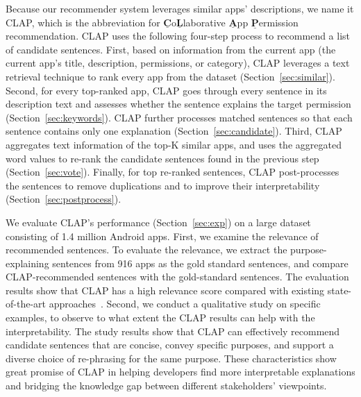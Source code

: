 Because our recommender system leverages similar apps' descriptions, we name it CLAP, which is the abbreviation for $\underline{\textbf{C}}$o$\underline{\textbf{L}}$laborative $\underline{\textbf{A}}$pp $\underline{\textbf{P}}$ermission recommendation. 
CLAP uses the following four-step process to recommend a list of candidate sentences. 
First, based on information from the current app (the current app's title, description, permissions, or category), CLAP leverages a text retrieval technique to rank every app from the dataset (Section~\ref{sec:similar}). 
Second, for every top-ranked app, CLAP goes through every sentence in its description text and assesses whether the sentence explains the target permission (Section~\ref{sec:keywords}). 
CLAP further processes matched sentences so that each sentence contains only one explanation (Section~\ref{sec:candidate}). Third, CLAP aggregates text information of the top-K similar apps, and uses the aggregated word values to re-rank the candidate sentences found in the previous step (Section~\ref{sec:vote}). 
Finally, for top re-ranked sentences, CLAP post-processes the sentences to remove duplications and to improve their interpretability (Section~\ref{sec:postprocess}). 

We evaluate CLAP's performance (Section~\ref{sec:exp}) on a large dataset consisting of 1.4 million Android apps. 
First, we examine the relevance of recommended sentences. \tabularnewline
To evaluate the relevance, we extract the purpose-explaining sentences from 916 apps as the gold standard sentences, and compare CLAP-recommended sentences with the gold-standard sentences. 
The evaluation results show that CLAP has a high relevance score compared with existing state-of-the-art approaches~\cite{conf/uss/PanditaXYEX13}. 
Second, we conduct a qualitative study on specific examples, to observe to what extent the CLAP results can help with the interpretability. 
The study results show that CLAP can effectively recommend candidate sentences that are concise, convey specific purposes, and support a diverse choice of re-phrasing for the same purpose. 
These characteristics show great promise of CLAP in helping developers find more interpretable explanations and bridging the knowledge gap between different stakeholders' viewpoints. 


